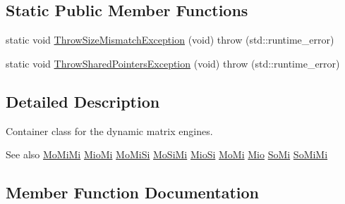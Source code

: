 \subsection*{Static Public Member Functions}
\begin{DoxyCompactItemize}
\item 
static void \hyperlink{classvct_dynamic_matrix_loop_engines_a51089dd3e50ade08ff00100f3f744553}{Throw\+Size\+Mismatch\+Exception} (void)  throw (std\+::runtime\+\_\+error)
\item 
static void \hyperlink{classvct_dynamic_matrix_loop_engines_aecf08e55d6f6cfdd1e9fe4aa91181a21}{Throw\+Shared\+Pointers\+Exception} (void)  throw (std\+::runtime\+\_\+error)
\end{DoxyCompactItemize}


\subsection{Detailed Description}
Container class for the dynamic matrix engines. 

\begin{DoxySeeAlso}{See also}
\hyperlink{classvct_dynamic_matrix_loop_engines_1_1_mo_mi_mi}{Mo\+Mi\+Mi} \hyperlink{classvct_dynamic_matrix_loop_engines_1_1_mio_mi}{Mio\+Mi} \hyperlink{classvct_dynamic_matrix_loop_engines_1_1_mo_mi_si}{Mo\+Mi\+Si} \hyperlink{classvct_dynamic_matrix_loop_engines_1_1_mo_si_mi}{Mo\+Si\+Mi} \hyperlink{classvct_dynamic_matrix_loop_engines_1_1_mio_si}{Mio\+Si} \hyperlink{classvct_dynamic_matrix_loop_engines_1_1_mo_mi}{Mo\+Mi} \hyperlink{classvct_dynamic_matrix_loop_engines_1_1_mio}{Mio} \hyperlink{classvct_dynamic_matrix_loop_engines_1_1_so_mi}{So\+Mi} \hyperlink{classvct_dynamic_matrix_loop_engines_1_1_so_mi_mi}{So\+Mi\+Mi} 
\end{DoxySeeAlso}


\subsection{Member Function Documentation}
\hypertarget{classvct_dynamic_matrix_loop_engines_aecf08e55d6f6cfdd1e9fe4aa91181a21}{}

